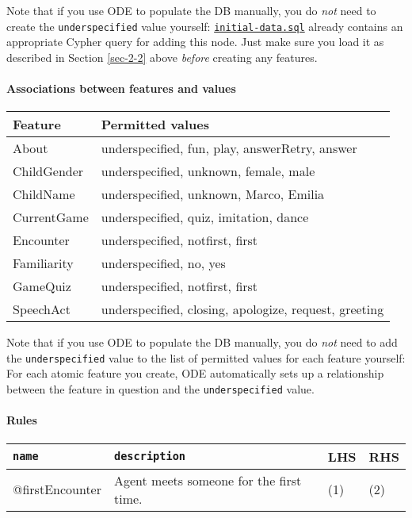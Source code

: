 \documentclass[11pt]{article}
\begin{document}
Note that if you use ODE to populate the DB manually, you do
\emph{not} need to create the \texttt{underspecified} value yourself:
\href{initial-data.cql}{\texttt{initial-data.sql}} already contains an appropriate Cypher query
for adding this node. Just make sure you load it as described in
Section \ref{sec-2-2} above \emph{before} creating any features.

\paragraph{Associations between features and values}
\label{sec-3-4-1-3}
\begin{center}
\begin{tabular}{ll}
\hline
\textbf{Feature} & \textbf{Permitted values}\\
\hline
About & underspecified, fun, play, answerRetry, answer\\
ChildGender & underspecified, unknown, female, male\\
ChildName & underspecified, unknown, Marco, Emilia\\
CurrentGame & underspecified, quiz, imitation, dance\\
Encounter & underspecified, notfirst, first\\
Familiarity & underspecified, no, yes\\
GameQuiz & underspecified, notfirst, first\\
SpeechAct & underspecified, closing, apologize, request, greeting\\
\hline
\end{tabular}
\end{center}

Note that if you use ODE to populate the DB manually, you do
\emph{not} need to add the \texttt{underspecified} value to the list of
permitted values for each feature yourself: For each atomic
feature you create, ODE automatically sets up a relationship
between the feature in question and the \texttt{underspecified} value.

\paragraph{Rules}
\label{sec-3-4-1-4}
\begin{center}
\begin{tabular}{llll}
\hline
\texttt{name} & \texttt{description} & \textbf{LHS} & \textbf{RHS}\\
\hline
@firstEncounter & Agent meets someone for the first time. & (1) & (2)\\
\hline
\end{tabular}
\end{center}
\end{document}
